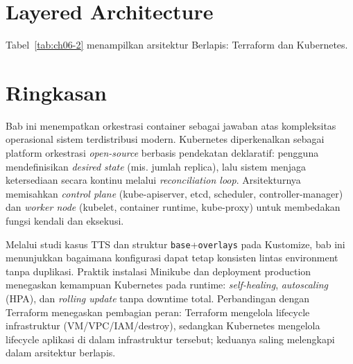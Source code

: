 \section{Layered Architecture}


Tabel~\ref{tab:ch06-2} menampilkan arsitektur Berlapis: Terraform dan Kubernetes.
\begin{table}[h!]
\centering
\small
{}
\caption{Arsitektur Berlapis: Terraform dan Kubernetes}
\label{tab:ch06-2}
\end{table}

\section{Ringkasan}

Bab ini menempatkan orkestrasi container sebagai jawaban atas kompleksitas operasional sistem terdistribusi modern. Kubernetes diperkenalkan sebagai platform orkestrasi \textit{open-source} berbasis pendekatan deklaratif: pengguna mendefinisikan \textit{desired state} (mis. jumlah replica), lalu sistem menjaga ketersediaan secara kontinu melalui \textit{reconciliation loop}. Arsitekturnya memisahkan \textit{control plane} (kube-apiserver, etcd, scheduler, controller-manager) dan \textit{worker node} (kubelet, container runtime, kube-proxy) untuk membedakan fungsi kendali dan eksekusi.

Melalui studi kasus TTS dan struktur \texttt{base}+\texttt{overlays} pada Kustomize, bab ini menunjukkan bagaimana konfigurasi dapat tetap konsisten lintas environment tanpa duplikasi. Praktik instalasi Minikube dan deployment production menegaskan kemampuan Kubernetes pada runtime: \textit{self-healing}, \textit{autoscaling} (HPA), dan \textit{rolling update} tanpa downtime total. Perbandingan dengan Terraform menegaskan pembagian peran: Terraform mengelola lifecycle infrastruktur (VM/VPC/IAM/destroy), sedangkan Kubernetes mengelola lifecycle aplikasi di dalam infrastruktur tersebut; keduanya saling melengkapi dalam arsitektur berlapis.

